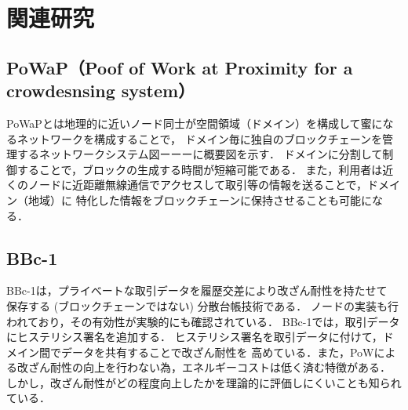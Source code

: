 \documentclass[a4paper,12pt]{jsarticle}
\begin{document}
\newpage
\section{関連研究}
      \subsection{PoWaP（Poof of Work at Proximity for a crowdesnsing system）}
PoWaPとは地理的に近いノード同士が空間領域（ドメイン）を構成して蜜になるネットワークを構成することで，
ドメイン毎に独自のブロックチェーンを管理するネットワークシステム図ーーーに概要図を示す．
ドメインに分割して制御することで，ブロックの生成する時間が短縮可能である．
また，利用者は近くのノードに近距離無線通信でアクセスして取引等の情報を送ることで，ドメイン（地域）に
特化した情報をブロックチェーンに保持させることも可能になる．


      \subsection{BBc-1}

BBc-1\cite{saito}は，プライベートな取引データを履歴交差により改ざん耐性を持たせて
保存する (ブロックチェーンではない) 分散台帳技術である．
ノードの実装も行われており，その有効性が実験的にも確認されている．
BBc-1では，取引データにヒステリシス署名を追加する．
ヒステリシス署名を取引データに付けて，ドメイン間でデータを共有することで改ざん耐性を
高めている．また，PoWによる改ざん耐性の向上を行わない為，エネルギーコストは低く済む特徴がある．
しかし，改ざん耐性がどの程度向上したかを理論的に評価しにくいことも知られている．
\end{document}
